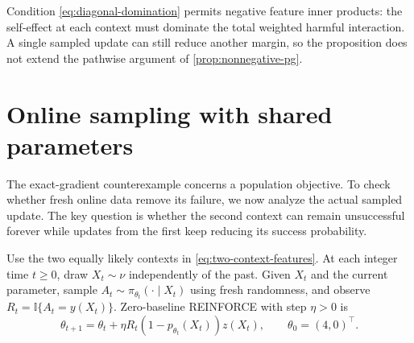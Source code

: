 \documentclass[11pt,twoside]{article}
\newcommand{\I}{\mathbb I}
\theoremstyle{definition}
\theoremstyle{remark}
\begin{document}
Condition \cref{eq:diagonal-domination} permits negative feature inner
products: the self-effect at each context must dominate the total weighted
harmful interaction. A single sampled update can still reduce another
margin, so the proposition does not extend the pathwise argument of
\cref{prop:nonnegative-pg}.

\section{Online sampling with shared parameters}
\label{app:shared-online}

The exact-gradient counterexample concerns a population objective. To check
whether fresh online data remove its failure, we now analyze the actual
sampled update. The key question is whether the second context can remain
unsuccessful forever while updates from the first keep reducing its success
probability.

Use the two equally likely contexts in \cref{eq:two-context-features}.
At each integer time $t\ge0$, draw $X_t\sim\nu$ independently of the
past. Given $X_t$ and the current parameter, sample
$A_t\sim\pi_{\theta_t}(\cdot\mid X_t)$ using fresh randomness, and observe
$R_t=\I\{A_t=y(X_t)\}$. Zero-baseline REINFORCE with step $\eta>0$ is
\begin{equation}
 \theta_{t+1}=\theta_t+\eta R_t(1-p_{\theta_t}(X_t))z(X_t),
 \qquad \theta_0=(4,0)^\top.
 \label{eq:shared-online}
\end{equation}
\end{document}
